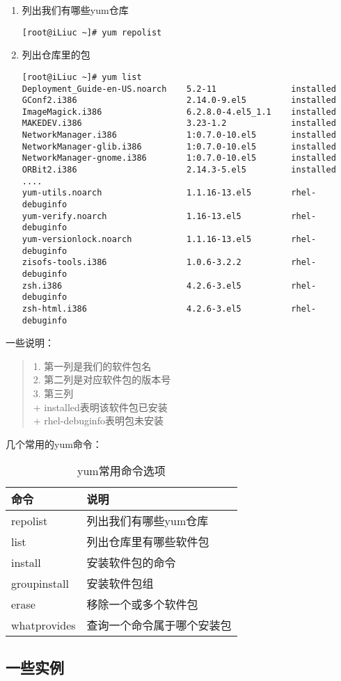 \begin{enumerate}[itemsep=0pt,parsep=0pt]
\item 列出我们有哪些yum仓库
  \small{
\begin{verbatim}
[root@iLiuc ~]# yum repolist
\end{verbatim}
  }
  \normalsize

\item 列出仓库里的包
\begin{verbatim}
[root@iLiuc ~]# yum list
Deployment_Guide-en-US.noarch    5.2-11               installed     
GConf2.i386                      2.14.0-9.el5         installed     
ImageMagick.i386                 6.2.8.0-4.el5_1.1    installed     
MAKEDEV.i386                     3.23-1.2             installed     
NetworkManager.i386              1:0.7.0-10.el5       installed     
NetworkManager-glib.i386         1:0.7.0-10.el5       installed     
NetworkManager-gnome.i386        1:0.7.0-10.el5       installed     
ORBit2.i386                      2.14.3-5.el5         installed    
....
yum-utils.noarch                 1.1.16-13.el5        rhel-debuginfo
yum-verify.noarch                1.16-13.el5          rhel-debuginfo
yum-versionlock.noarch           1.1.16-13.el5        rhel-debuginfo
zisofs-tools.i386                1.0.6-3.2.2          rhel-debuginfo
zsh.i386                         4.2.6-3.el5          rhel-debuginfo
zsh-html.i386                    4.2.6-3.el5          rhel-debuginfo
\end{verbatim}
\end{enumerate}

一些说明：
\begin{quote}
    1. 第一列是我们的软件包名 \\
    2. 第二列是对应软件包的版本号 \\
    3. 第三列 \\
    + installed表明该软件包已安装 \\
    + rhel-debuginfo表明包未安装 
\end{quote}

几个常用的yum命令：
\begin{table}[!htbp]
  \centering
    \caption{yum常用命令选项}
    \begin{tabular}{ll}
      \toprule
      命令           & 说明 \\
      \midrule
      repolist       & 列出我们有哪些yum仓库 \\
      list           & 列出仓库里有哪些软件包 \\
      install        & 安装软件包的命令 \\
      groupinstall   & 安装软件包组 \\
      erase          & 移除一个或多个软件包 \\
      whatprovides   & 查询一个命令属于哪个安装包 \\
      \bottomrule
    \end{tabular}
\end{table}

\subsection{一些实例}
\label{sec:yumExamples}